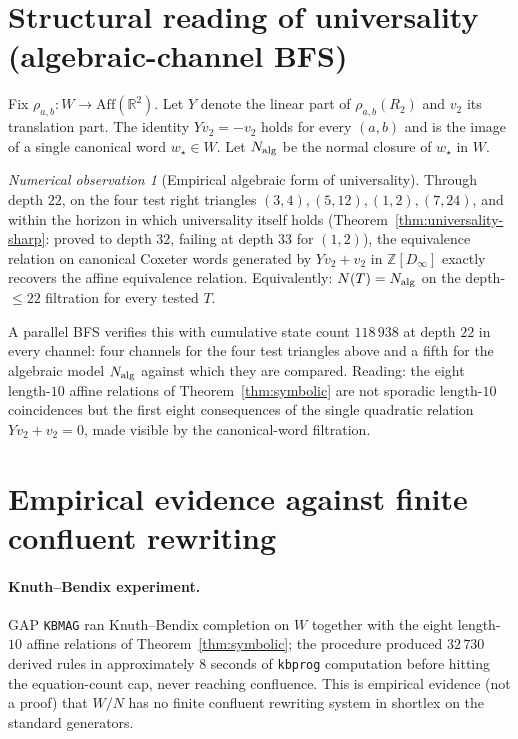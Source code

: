 \documentclass[11pt]{article}
\theoremstyle{plain}
\theoremstyle{definition}
\theoremstyle{remark}
\newtheorem{observation}[theorem]{Numerical observation}
\begin{document}
\section{Structural reading of universality (algebraic-channel BFS)}
\label{sec:univ-algebraic}

Fix $\rho_{a,b}: W \to \mathrm{Aff}(\mathbb{R}^2)$.  Let $Y$ denote the
linear part of $\rho_{a,b}(R_2)$ and $v_2$ its translation part.  The
identity $Y v_2 = -v_2$ holds for every $(a, b)$ and is the image of a
single canonical word $w_\star \in W$.  Let $N_{\rm alg}$ be the normal
closure of $w_\star$ in $W$.

\begin{observation}[Empirical algebraic form of universality]
\label{obs:alg-structural}
Through depth $22$, on the four test right triangles $(3, 4), (5, 12),
(1, 2), (7, 24)$, and within the horizon in which universality itself holds
(Theorem~\ref{thm:universality-sharp}: proved to depth $32$, failing at
depth $33$ for $(1,2)$), the equivalence relation on canonical Coxeter words
generated by $Y v_2 + v_2$ in $\mathbb{Z}[D_\infty]$ exactly recovers
the affine equivalence relation.  Equivalently: $N(T) = N_{\rm alg}$ on
the depth-$\le 22$ filtration for every tested $T$.
\end{observation}

A parallel BFS verifies this with cumulative state count $118\,938$ at
depth $22$ in every channel: four channels for the four test triangles
above and a fifth for the algebraic model $N_{\rm alg}$ against which
they are compared.  Reading: the eight
length-$10$ affine relations of Theorem~\ref{thm:symbolic} are not
sporadic length-$10$ coincidences but the first eight consequences of
the single quadratic relation $Y v_2 + v_2 = 0$, made visible by the
canonical-word filtration.

\section{Empirical evidence against finite confluent rewriting}
\label{sec:rewriting}

\paragraph{Knuth--Bendix experiment.}
GAP \texttt{KBMAG} ran Knuth--Bendix completion on $W$ together with
the eight length-$10$ affine relations of Theorem~\ref{thm:symbolic};
the procedure produced $32\,730$ derived rules in approximately $8$
seconds of \texttt{kbprog} computation before hitting the equation-count
cap, never reaching confluence.  This is empirical evidence (not a
proof) that $W/N$ has no finite confluent rewriting system in shortlex
on the standard generators.
\end{document}
